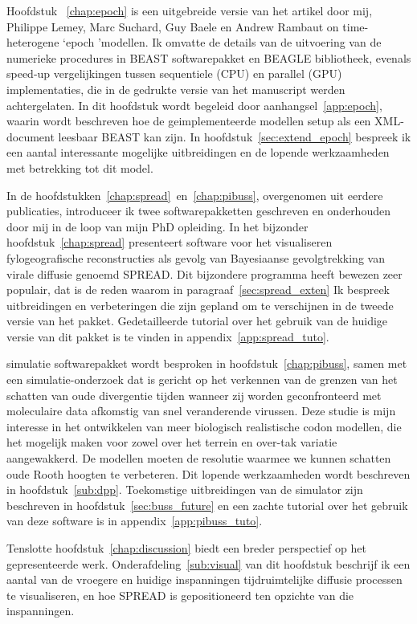 Hoofdstuk ~\ref{chap:epoch} is een uitgebreide versie van het artikel door mij, Philippe Lemey, Marc Suchard, Guy Baele en Andrew Rambaut \citep{Bielejec2014a} on time-heterogene `epoch 'modellen.
Ik omvatte de details van de uitvoering van de numerieke procedures in BEAST softwarepakket en BEAGLE bibliotheek, evenals speed-up vergelijkingen tussen sequentiele (CPU) en parallel (GPU) implementaties, die in de gedrukte versie van het manuscript werden achtergelaten.
In dit hoofdstuk wordt begeleid door aanhangsel~\ref{app:epoch}, waarin wordt beschreven hoe de geimplementeerde modellen setup als een XML-document leesbaar BEAST kan zijn.
In hoofdstuk~\ref{sec:extend_epoch} bespreek ik een aantal interessante mogelijke uitbreidingen en de lopende werkzaamheden met betrekking tot dit model.

In de hoofdstukken~\ref{chap:spread}~en~\ref{chap:pibuss}, overgenomen uit eerdere publicaties, introduceer ik twee softwarepakketten geschreven en onderhouden door mij in de loop van mijn PhD opleiding.
In het bijzonder hoofdstuk~\ref{chap:spread} presenteert software voor het visualiseren fylogeografische reconstructies als gevolg van Bayesiaanse gevolgtrekking van virale diffusie genoemd SPREAD.
Dit bijzondere programma heeft bewezen zeer populair, dat is de reden waarom in paragraaf~\ref{sec:spread_exten} Ik bespreek uitbreidingen en verbeteringen die zijn gepland om te verschijnen in de tweede versie van het pakket.
Gedetailleerde tutorial over het gebruik van de huidige versie van dit pakket is te vinden in appendix~\ref{app:spread_tuto}.

{\bussname} simulatie softwarepakket wordt besproken in hoofdstuk~\ref{chap:pibuss}, samen met een simulatie-onderzoek dat is gericht op het verkennen van de grenzen van het schatten van oude divergentie tijden wanneer zij worden geconfronteerd met moleculaire data afkomstig van snel veranderende virussen.
Deze studie is mijn interesse in het ontwikkelen van meer biologisch realistische codon modellen, die het mogelijk maken voor zowel over het terrein en over-tak variatie aangewakkerd.
De modellen moeten de resolutie waarmee we kunnen schatten oude Rooth hoogten te verbeteren. %
Dit lopende werkzaamheden wordt beschreven in hoofdstuk~\ref{sub:dpp}.
Toekomstige uitbreidingen van de {\bussname} simulator zijn beschreven in hoofdstuk~\ref{sec:buss_future} en een zachte tutorial over het gebruik van deze software is in appendix~\ref{app:pibuss_tuto}.

Tenslotte hoofdstuk~\ref{chap:discussion} biedt een breder perspectief op het gepresenteerde werk.
Onderafdeling~\ref{sub:visual} van dit hoofdstuk beschrijf ik een aantal van de vroegere en huidige inspanningen tijdruimtelijke diffusie processen te visualiseren, en hoe SPREAD is gepositioneerd ten opzichte van die inspanningen.


